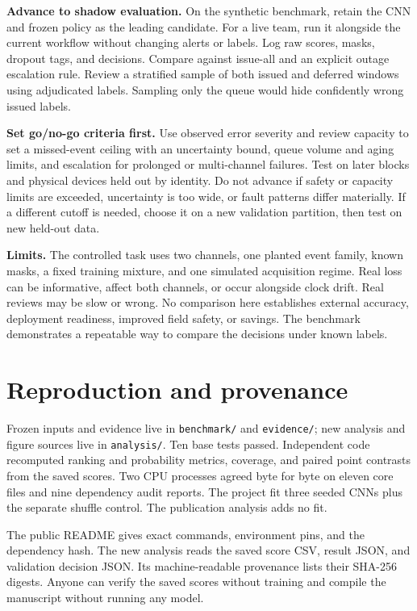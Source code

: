 \documentclass[11pt,letterpaper]{article}
\begin{document}
\textbf{Advance to shadow evaluation.} On the synthetic benchmark, retain the CNN and frozen policy as the leading candidate. For a live team, run it alongside the current workflow without changing alerts or labels. Log raw scores, masks, dropout tags, and decisions. Compare against issue-all and an explicit outage escalation rule. Review a stratified sample of both issued and deferred windows using adjudicated labels. Sampling only the queue would hide confidently wrong issued labels.

\textbf{Set go/no-go criteria first.} Use observed error severity and review capacity to set a missed-event ceiling with an uncertainty bound, queue volume and aging limits, and escalation for prolonged or multi-channel failures. Test on later blocks and physical devices held out by identity. Do not advance if safety or capacity limits are exceeded, uncertainty is too wide, or fault patterns differ materially. If a different cutoff is needed, choose it on a new validation partition, then test on new held-out data.

\textbf{Limits.} The controlled task uses two channels, one planted event family, known masks, a fixed training mixture, and one simulated acquisition regime. Real loss can be informative, affect both channels, or occur alongside clock drift. Real reviews may be slow or wrong. No comparison here establishes external accuracy, deployment readiness, improved field safety, or savings. The benchmark demonstrates a repeatable way to compare the decisions under known labels.

\section{Reproduction and provenance}

Frozen inputs and evidence live in \texttt{benchmark/} and \texttt{evidence/}; new analysis and figure sources live in \texttt{analysis/}. Ten base tests passed. Independent code recomputed ranking and probability metrics, coverage, and paired point contrasts from the saved scores. Two CPU processes agreed byte for byte on eleven core files and nine dependency audit reports. The project fit three seeded CNNs plus the separate shuffle control. The publication analysis adds no fit.

The public README gives exact commands, environment pins, and the dependency hash. The new analysis reads the saved score CSV, result JSON, and validation decision JSON. Its machine-readable provenance lists their SHA-256 digests. Anyone can verify the saved scores without training and compile the manuscript without running any model.
\end{document}
